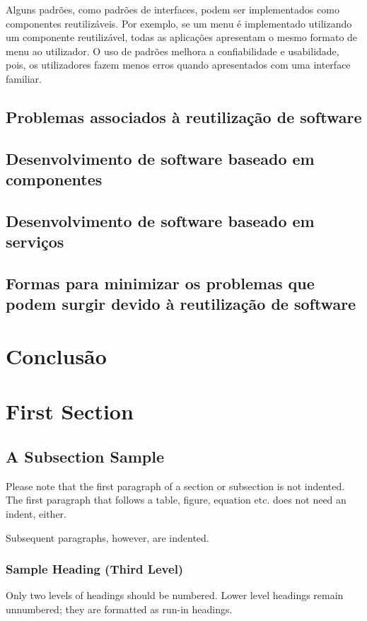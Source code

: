 \documentclass[runningheads]{llncs}
\begin{document}
Alguns padrões, como padrões de interfaces, podem ser implementados como componentes reutilizáveis. Por exemplo, se um menu é implementado utilizando um componente reutilizável, todas as aplicações apresentam o mesmo formato de menu ao utilizador. O uso de padrões melhora a confiabilidade e usabilidade, pois, os utilizadores fazem menos erros quando apresentados com uma interface familiar.

\subsection{Problemas associados à reutilização de software}

\subsection{Desenvolvimento de software baseado em componentes}


\subsection{Desenvolvimento de software baseado em serviços}



\subsection{Formas para minimizar os problemas que podem surgir devido à reutilização de software}

\section{Conclusão}


\section{First Section}
\subsection{A Subsection Sample}
Please note that the first paragraph of a section or subsection is
not indented. The first paragraph that follows a table, figure,
equation etc. does not need an indent, either.

Subsequent paragraphs, however, are indented.

\subsubsection{Sample Heading (Third Level)} Only two levels of
headings should be numbered. Lower level headings remain unnumbered;
they are formatted as run-in headings.
\end{document}
